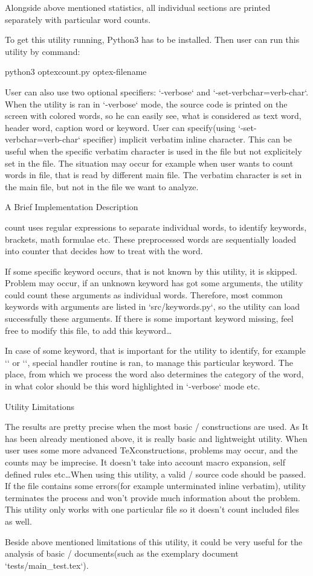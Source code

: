 Alongside above mentioned statistics, all individual sections are printed separately with particular word counts.

To get this utility running, Python3 has to be installed. Then user can run this utility by command:

\begtt
python3 optexcount.py optex-filename
\endtt

User can also use two optional specifiers: {\Blue `-verbose`} and {\Blue `-set-verbchar=verb-char`}. When the utility is ran in {\Blue `-verbose`} mode, the source code is printed on the screen with colored words, so he can easily see, what is considered as text word, header word, caption word or keyword. User can specify(using {\Blue `-set-verbchar=verb-char`} specifier) implicit verbatim inline character. This can be useful when the specific verbatim character is used in the file but not explicitely set in the file. The situation may occur for example when user wants to count words in file, that is read by different main file. The verbatim character is set in the main file, but not in the file we want to analyze.

\sec A Brief Implementation Description

\OpTeX count uses regular expressions to separate individual words, to identify keywords, brackets, math formulae etc. These preprocessed words are sequentially loaded into counter that decides how to treat with the word.

If some specific keyword occurs, that is not known by this utility, it is skipped. Problem may occur, if an unknown keyword has got some arguments, the utility could count these arguments as individual words. Therefore, most common keywords with arguments are listed in `src/keywords.py`, so the utility can load successfully these arguments. If there is some important keyword missing, feel free to modify this file, to add this keyword\dots

In case of some keyword, that is important for the utility to identify, for example {\Blue `\sec`} or {\Blue `\fnote`}, special handler routine is ran, to manage this particular keyword. The place, from which we process the word also determines the category of the word, in what color should be this word highlighted in {\Blue `-verbose`} mode etc.


\sec Utility Limitations

The results are pretty precise when the most basic \OpTeX/ constructions are used. As It has been already mentioned above, it is really basic and lightweight utility. When user uses some more advanced \TeX constructions, problems may occur, and the counts may be imprecise. It doesn't take into account macro expansion, self defined rules etc\dots When using this utility, a valid \OpTeX/ source code should be passed. If the file contains some errors(for example unterminated inline verbatim), utility terminates the process and won't provide much information about the problem. This utility only works with one particular file so it doesn't count included files as well.

Beside above mentioned limitations of this utility, it could be very useful for the analysis of basic \OpTeX/ documents(such as the exemplary document {\Blue `tests/main_test.tex`}).

\bye
